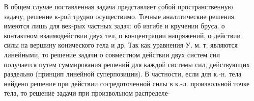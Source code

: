\documentclass[10pt]{article}
\begin{document}
В общем случае поставленная задача представляет собой пространственную задачу, решение к-рой трудно осуществимо. Точные аналитические решения имеются лишь для век-рых частных задач: об изгибе и кручении бруса. о контактном взаимодействии двух тел, о концентрации напряжений, о действии силы на вершину конического гела и др. Так как уравнения У. м. т. являются линейными, то решение задачи о совместном действии двух систем сил получается путем суммирования решений для каждой системы сил, действующих раздельно (принцип линейной суперпозиции). В частности, если для к.-н. тела найдено решение при действии сосредоточенной силы в к.-л. произвольной точке тела, то решение задачи при произвольном распределе-
\end{document}
